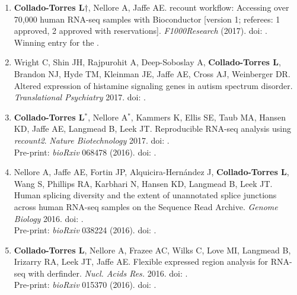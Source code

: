 \begin{enumerate}
        \item \textbf{Collado-Torres L}$\dagger$, Nellore A, Jaffe AE. 
        recount workflow: Accessing over 70,000 human RNA-seq samples with Bioconductor [version 1; referees: 1 approved, 2 approved with reservations]. \emph{F1000Research} (2017). doi: .
        \\ Winning entry for the .
        
        \item Wright C, Shin JH, Rajpurohit A, Deep-Soboslay A, \textbf{Collado-Torres L}, Brandon NJ, Hyde TM, Kleinman JE, Jaffe AE, Cross AJ, Weinberger DR. Altered expression of histamine signaling genes in autism spectrum disorder. \emph{Translational Psychiatry} 2017. doi: .
        
        \item \textbf{Collado-Torres L}$^{*}$, Nellore A$^{*}$, Kammers K, Ellis SE, Taub MA, Hansen KD, Jaffe AE, Langmead B, Leek JT. Reproducible RNA-seq analysis using \emph{recount2}. \emph{Nature Biotechnology} 2017. doi: .
        \\ Pre-print: \emph{bioRxiv} 068478 (2016). doi: .
        
        \item Nellore A, Jaffe AE, Fortin JP, Alquicira-Hernández J, \textbf{Collado-Torres L}, Wang S, Phillips RA, Karbhari N, Hansen KD, Langmead B, Leek JT. Human splicing diversity and the extent of unannotated splice junctions across human RNA-seq samples on the Sequence Read Archive. \emph{Genome Biology} 2016. doi: .
        \\ Pre-print: \emph{bioRxiv} 038224 (2016). doi: .
        
        \item \textbf{Collado-Torres L}, Nellore A, Frazee AC, Wilks C, Love MI, Langmead B, Irizarry RA, Leek JT, Jaffe AE. Flexible expressed region analysis for RNA-seq with derfinder. \emph{Nucl. Acids Res.} 2016. doi: .
        \\ Pre-print: \emph{bioRxiv} 015370 (2016). doi: .
        

\end{enumerate}
